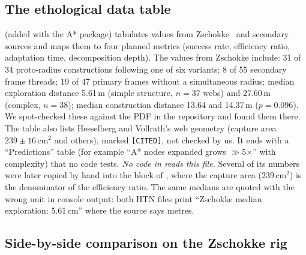 \subsection{The ethological data table}
\label{sec:astar_fap-empirical}

 (added with the A* package) tabulates values from
Zschokke~\cite{zschokke1996early} and secondary sources and maps them to four planned metrics
(success rate, efficiency ratio, adaptation time, decomposition depth). The values from Zschokke
include: 31 of 34 proto-radius constructions following one of six variants; 8 of 55 secondary frame
threads; 19 of 47 primary frames without a simultaneous radius; median exploration distance 5.61\,m
(simple structure, $n=37$ webs) and 27.60\,m (complex, $n=38$); median construction distance 13.64
and 14.37\,m ($p=0.096$). We spot-checked these against the PDF in the repository and found them
there. The table also lists Hesselberg and Vollrath's web geometry (capture area $239\pm16$\,cm$^2$
and others), marked \texttt{[CITED]}, not checked by us. It ends with a ``Predictions'' table
(for example ``A* nodes expanded grows $\gg$5$\times$'' with complexity) that no code tests.
\emph{No code in  reads this file.} Several of its numbers were later
copied by hand into the  block of ,
where the capture area (239\,cm$^2$) is the denominator of the efficiency ratio. The same medians
are quoted with the wrong unit in console output: both HTN  files print ``Zschokke
median exploration: 5.61\,cm'' where the source says metres.

\subsection{Side-by-side comparison on the Zschokke rig}
\label{sec:astar_fap-compare}

